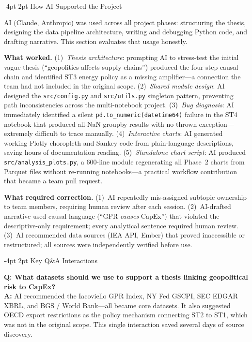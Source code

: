 \documentclass[10pt,twocolumn,letterpaper]{article}
\makeatletter
\renewcommand\subsection{\@startsection{subsection}{2}{\z@}%
  {-4pt \@plus -1pt \@minus -1pt}{2pt \@plus 1pt}%
  {\normalfont\small\bfseries\color{accent}}}
\makeatother
\begin{document}
\subsection{How AI Supported the Project}

AI (Claude, Anthropic) was used across all project phases: structuring the thesis, designing the
data pipeline architecture, writing and debugging Python code, and drafting narrative. This
section evaluates that usage honestly.

\textbf{What worked.} (1)~\textit{Thesis architecture}: prompting AI to stress-test the initial
vague thesis (``geopolitics affects supply chains'') produced the four-step causal chain and
identified ST3 energy policy as a missing amplifier---a connection the team had not included in
the original scope. (2)~\textit{Shared module design}: AI designed the \texttt{src/config.py}
and \texttt{src/utils.py} singleton pattern, preventing path inconsistencies across the
multi-notebook project. (3)~\textit{Bug diagnosis}: AI immediately identified a silent
\texttt{pd.to\_numeric(datetime64)} failure in the ST4 notebook that produced all-NaN groupby
results with no thrown exception---extremely difficult to trace manually.
(4)~\textit{Interactive charts}: AI generated working Plotly choropleth and Sankey code from
plain-language descriptions, saving hours of documentation reading.
(5)~\textit{Standalone chart script}: AI produced \texttt{src/analysis\_plots.py}, a 600-line
module regenerating all Phase~2 charts from Parquet files without re-running notebooks---a
practical workflow contribution that became a team pull request.

\textbf{What required correction.} (1)~AI repeatedly mis-assigned subtopic ownership to team
members, requiring human review after each session. (2)~AI-drafted narrative used causal language
(``GPR \textit{causes} CapEx'') that violated the descriptive-only requirement; every analytical
sentence required human review. (3)~AI recommended data sources (IEA API, Ember) that proved
inaccessible or restructured; all sources were independently verified before use.

\subsection{Key Q\&A Interactions}

\textbf{Q: What datasets should we use to support a thesis linking geopolitical risk to CapEx?}\\
\textbf{A:} AI recommended the Iacoviello GPR Index, NY Fed GSCPI, SEC EDGAR XBRL, and BGS /
World Bank---all became core datasets. It also suggested OECD export restrictions as the policy
mechanism connecting ST2 to ST1, which was not in the original scope. This single interaction
saved several days of source discovery.
\end{document}
